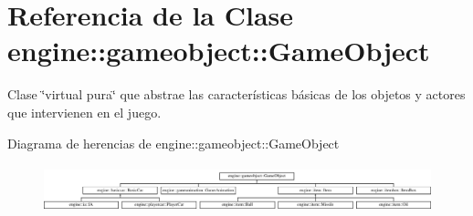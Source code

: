 \hypertarget{classengine_1_1gameobject_1_1GameObject}{
\section{\-Referencia de la \-Clase engine\-:\-:gameobject\-:\-:\-Game\-Object}
\label{classengine_1_1gameobject_1_1GameObject}
}


\-Clase \char`\"{}virtual pura\char`\"{} que abstrae las características básicas de los objetos y actores que intervienen en el juego.  


\-Diagrama de herencias de engine\-:\-:gameobject\-:\-:\-Game\-Object\begin{figure}[H]
\begin{center}
\leavevmode
\includegraphics[height=1.400000cm]{classengine_1_1gameobject_1_1GameObject}
\end{center}
\end{figure}
